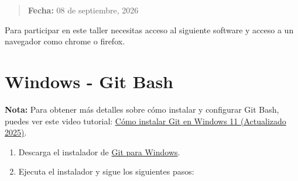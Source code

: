 \documentclass[
  spanish,
  12pt,
  letterpaper,
  DIV=11,
  numbers=noendperiod]{scrreprt}
\begin{document}
\begin{quote}
\textbf{Fecha:} 08 de septiembre, 2026
\end{quote}

Para participar en este taller necesitas acceso al siguiente software y
acceso a un navegador como chrome o firefox.

\section{Windows - Git Bash}\label{windows---git-bash}

\textbf{Nota:} Para obtener más detalles sobre cómo instalar y
configurar Git Bash, puedes ver este video tutorial:
\href{https://www.youtube.com/watch?v=t2-l3WvWvqg}{Cómo instalar Git en
Windows 11 (Actualizado 2025)}.

\begin{enumerate}
\def\labelenumi{\arabic{enumi}.}
\item
  Descarga el instalador de \href{https://gitforwindows.org/}{Git para
  Windows}.
\item
  Ejecuta el instalador y sigue los siguientes pasos:


\end{enumerate}
\end{document}
